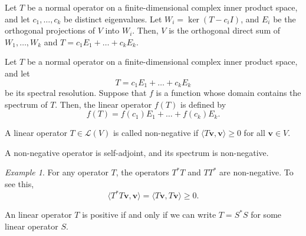 \documentclass[11pt]{article}
\renewcommand{\vec}[1]{\boldsymbol{#1}}
\newcommand{\vv}{\vec{v}}
\newcommand{\alg}[1]{\mathscr{#1}}
\newcommand{\algL}{\alg{L}}
\newcommand{\ip}[2]{\langle #1, #2 \rangle}
\renewcommand{\ker}{\operatorname{ker}}
\theoremstyle{definition}
\theoremstyle{remark}
\newtheorem*{example}{Example}
\numberwithin{equation}{section}
\begin{document}
    \begin{theorem}
        Let $T$ be a normal operator on a finite-dimensional complex inner product
        space, and let $c_1, \dots, c_k$ be distinct eigenvalues. Let $W_i = \ker(T -
        c_iI)$, and $E_i$ be the orthogonal projections of $V$ into $W_i$. Then, $V$
        is the orthogonal direct sum of $W_1, \dots, W_k$ and $T = c_1E_1 + \dots +
        c_kE_k$.
    \end{theorem}

    \begin{definition}
        Let $T$ be a normal operator on a finite-dimensional complex inner product
        space, and let \[
            T = c_1E_1 + \dots + c_kE_k
        \] be its spectral resolution. Suppose that $f$ is a function whose domain
        contains the spectrum of $T$. Then, the linear operator $f(T)$ is defined by
        \[
            f(T) = f(c_1)E_1 + \dots + f(c_k)E_k.
        \] 
    \end{definition}


    \begin{definition}
        A linear operator $T \in \algL(V)$ is called non-negative if $\ip{T\vv}{\vv}
        \geq 0$ for all $\vv \in V$.
    \end{definition}

    \begin{lemma}
        A non-negative operator is self-adjoint, and its spectrum is non-negative.
    \end{lemma}

    \begin{example}
        For any operator $T$, the operators $T^*T$ and $TT^*$ are non-negative. To
        see this, \[
            \ip{T^*T \vv}{\vv} = \ip{T\vv}{T\vv} \geq 0.
        \] 
    \end{example}
    
    \begin{lemma}
        An linear operator $T$ is positive if and only if we can write $T = S^*S$ for
        some linear operator $S$.
    \end{lemma}
\end{document}
